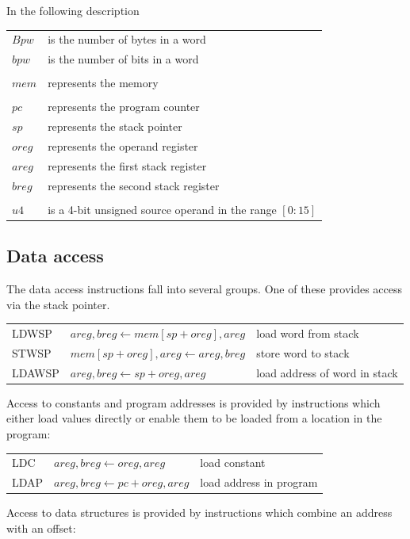 \documentclass[a4paper, 12pt]{article}
\begin{document}
In the following description

\begin{tabular}{ll}
$Bpw$ &is the number of bytes in a word \\
$bpw$ & is the number of bits in a word \\
&\\
$mem$ & represents the memory \\
&\\
$pc$ & represents the program counter\\
$sp$ & represents the stack pointer\\
$oreg$ & represents the operand register\\
$areg$ & represents the first stack register\\
$breg$ & represents the second stack register\\
&\\
$u4$ & is a 4-bit unsigned source operand in the range $[0:15]$\\
\end{tabular}

\subsection*{Data access}

The data access instructions fall into several groups. One of these
provides access via the stack pointer.

\begin{tabular}{lll}
LDWSP & $areg, breg \leftarrow mem[sp + oreg], areg$& load word from stack \\ 
STWSP & $mem[sp + oreg], areg \leftarrow areg, breg $& store word to stack  \\
LDAWSP & $areg, breg \leftarrow sp + oreg, areg $& load address of word in stack  
\end{tabular}

Access to constants and program addresses is provided by instructions which 
either load values directly or enable them to be loaded from a location in 
the program: 

\begin{tabular}{lll}
LDC  & $areg, breg \leftarrow oreg, areg $& load constant  \\
LDAP & $areg, breg \leftarrow pc + oreg, areg $& load address in program  
\end{tabular}

Access to data structures is provided by instructions which combine an
address with an offset:
\end{document}
